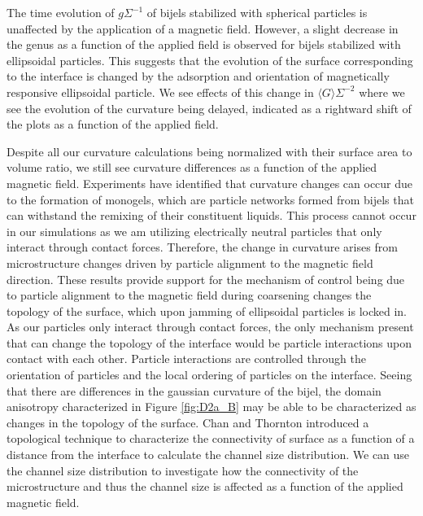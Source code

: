The time evolution of $g \Sigma^{-1}$ of bijels stabilized with spherical particles is unaffected by the application of a magnetic field. However, a 
slight decrease in the genus as a function of the applied field is observed for bijels stabilized with ellipsoidal particles. This suggests that the 
evolution of the surface corresponding to the interface is changed by the adsorption and orientation of magnetically responsive ellipsoidal particle. 
We see effects of this change in $\langle G \rangle \Sigma^{-2}$ where we see the evolution of the curvature being delayed, indicated as a rightward 
shift of the plots as a function of the applied field. 

Despite all our curvature calculations being normalized with their surface area to volume ratio, we still see curvature differences as a function of the applied 
magnetic field. Experiments have identified that curvature changes can occur due to the formation of monogels, which are particle networks formed from bijels that 
can withstand the remixing of their constituent liquids. \cite{sanz_colloidal_2009, lee_making_2013} This process cannot occur in our simulations as we am utilizing 
electrically neutral particles that only interact through contact forces. Therefore, the change in curvature arises from microstructure changes driven by particle 
alignment to the magnetic field direction. These results provide support for the mechanism of control being due to particle alignment to the magnetic field during 
coarsening changes the topology of the surface, which upon jamming of ellipsoidal particles is locked in. As our particles only interact through contact forces, 
the only mechanism present that can change the topology of the interface would be particle interactions upon contact with each other. Particle interactions are 
controlled through the orientation of particles and the local ordering of particles on the interface. Seeing that there are differences in the gaussian curvature of the bijel,
the domain anisotropy characterized in Figure \ref{fig:D2a_B} may be able to be characterized as changes in the topology of the surface. Chan and Thornton introduced a 
topological technique to characterize the connectivity of surface as a function of a distance from the interface to calculate the channel size distribution. 
\cite{chan_channel_2012} We can use the channel size distribution to investigate how the connectivity of the microstructure and thus the 
channel size is affected as a function of the applied magnetic field.

